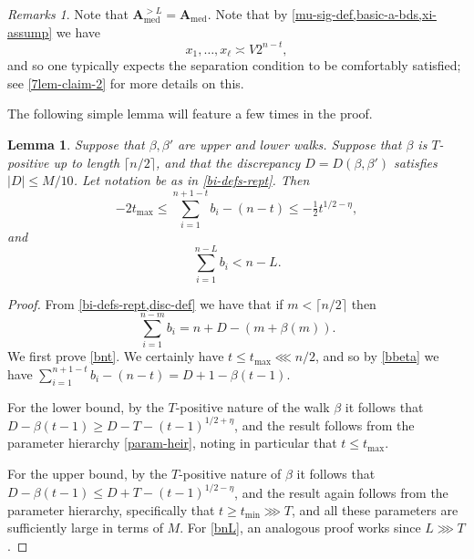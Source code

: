 \documentclass[11pt,reqno]{amsart}
\numberwithin{equation}{section}
\newtheorem{lemma}[theorem]{Lemma}
\theoremstyle{definition}
\theoremstyle{remark}
\newtheorem*{remarks}{Remarks}
\newcommand{\mbf}{\mathbf}
\renewcommand{\le}{\leqslant}
\renewcommand{\ge}{\geqslant}
\def\med{\operatorname{med}}
\begin{document}
\begin{remarks} Note that $\mbf{A}_{\med}^{> L} = \mbf{A}_{\med}$. Note that by \cref{mu-sig-def,basic-a-bds,xi-assump} we have
\begin{equation} \label{xi-rough} x_1,\dots, x_{\ell} \asymp V 2^{n - t},\end{equation} and so one typically expects the separation condition to be comfortably satisfied; see \cref{7lem-claim-2} for more details on this.
\end{remarks}

The following simple lemma will feature a few times in the proof.
\begin{lemma}
Suppose that $\beta, \beta'$ are upper and lower walks. Suppose that $\beta$ is $T$-positive up to length $\lceil n/2\rceil$, and that the discrepancy $D = D(\beta,\beta')$ satisfies $|D| \le M/10$. Let notation be as in \cref{bi-defs-rept}. Then
\begin{equation}\label{bnt} -2t_{\max} \le \sum_{i=1}^{n + 1 - t} b_{i} - (n - t)  \le - \tfrac{1}{2}t^{1/2 - \eta},\end{equation}
and
\begin{equation}\label{bnL} \sum_{i = 1}^{n-L} b_{i} < n - L.\end{equation}
\end{lemma}
\begin{proof} 
From \cref{bi-defs-rept,disc-def} we have that if $m < \lceil n/2\rceil$ then \begin{equation}\label{bbeta}\sum_{i = 1}^{n - m} b_{i} =  n + D - (m + \beta(m)).\end{equation}
 We first prove \cref{bnt}. We certainly have $t \le t_{\max} \lll n/2$, and so by \cref{bbeta} we have $\sum_{i = 1}^{n + 1 - t} b_i - (n - t) = D + 1 - \beta(t - 1)$. 
 
 For the lower bound, by the $T$-positive nature of the walk $\beta$ it follows that $D - \beta(t-1) \ge D - T - (t - 1)^{1/2 + \eta}$, and the result follows from the parameter hierarchy \cref{param-heir}, noting in particular that $t \le t_{\max}$.

 For the upper bound, by the $T$-positive nature of $\beta$ it follows that $D - \beta(t-1) \le D + T - (t - 1)^{1/2 - \eta}$, and the result again follows from the parameter hierarchy, specifically that $t \ge t_{\min} \ggg T$, and all these parameters are sufficiently large in terms of $M$. For \cref{bnL}, an analogous proof works since $L \ggg T$.
\end{proof}
\end{document}
